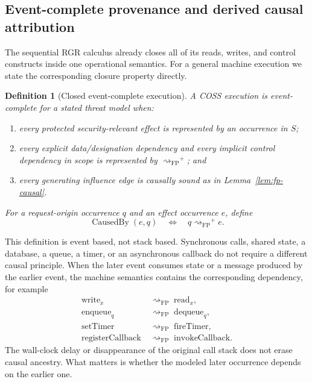 \documentclass[10pt,twocolumn]{article}
\newcommand{\Model}{\textnormal{\textsc{COSS}}\xspace}
\newcommand{\FP}{\mathrm{FP}}
\newcommand{\Influence}{\mathrel{\rightsquigarrow_{\!\FP}}}
\newcommand{\CausedBy}{\operatorname{CausedBy}}
\newtheorem{definition}{Definition}
\begin{document}
\subsection{Event-complete provenance and derived causal attribution}

The sequential RGR calculus already closes all of its reads, writes, and
control constructs inside one operational semantics. For a general machine
execution we state the corresponding closure property directly.

\begin{definition}[Closed event-complete execution]
\label{def:event-complete}
A \Model execution is \emph{event-complete} for a stated threat model when:
\begin{enumerate}[label=(E\arabic*),leftmargin=*]
  \item every protected security-relevant effect is represented by an
        occurrence in $S$;
  \item every explicit data/designation dependency and every implicit control
        dependency in scope is represented by $\Influence^{+}$; and
  \item every generating influence edge is causally sound as in
        Lemma~\ref{lem:fp-causal}.
\end{enumerate}
For a request-origin occurrence $q$ and an effect occurrence $e$, define
\begin{equation}
  \CausedBy(e,q)
  \quad\Longleftrightarrow\quad
  q\Influence^{+}e.
  \label{eq:causedby-reach}
\end{equation}
\end{definition}

This definition is event based, not stack based. Synchronous calls, shared
state, a database, a queue, a timer, or an asynchronous callback do not require
a different causal principle. When the later event consumes state or a message
produced by the earlier event, the machine semantics contains the corresponding
dependency, for example
\begin{align}
 \mathrm{write}_x &\;\Influence\; \mathrm{read}_x,\\
 \mathrm{enqueue}_q &\;\Influence\; \mathrm{dequeue}_q,\\
 \mathrm{setTimer} &\;\Influence\; \mathrm{fireTimer},\\
 \mathrm{registerCallback} &\;\Influence\; \mathrm{invokeCallback}.
\end{align}
The wall-clock delay or disappearance of the original call stack does not erase
causal ancestry. What matters is whether the modeled later occurrence depends
on the earlier one.
\end{document}
